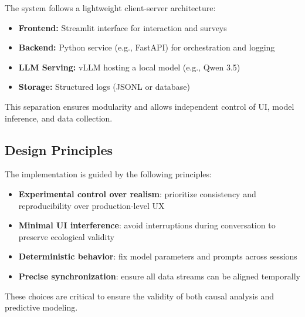 \documentclass{article}
\begin{document}
The system follows a lightweight client-server architecture:

\begin{itemize}
    \item \textbf{Frontend:} Streamlit interface for interaction and surveys
    \item \textbf{Backend:} Python service (e.g., FastAPI) for orchestration and logging
    \item \textbf{LLM Serving:} vLLM hosting a local model (e.g., Qwen 3.5)
    \item \textbf{Storage:} Structured logs (JSONL or database)
\end{itemize}

This separation ensures modularity and allows independent control of UI, model inference, and data collection.

\vspace{0.3cm}

\subsection{Design Principles}

The implementation is guided by the following principles:

\begin{itemize}
    \item \textbf{Experimental control over realism}: prioritize consistency and reproducibility over production-level UX
    \item \textbf{Minimal UI interference}: avoid interruptions during conversation to preserve ecological validity
    \item \textbf{Deterministic behavior}: fix model parameters and prompts across sessions
    \item \textbf{Precise synchronization}: ensure all data streams can be aligned temporally
\end{itemize}

These choices are critical to ensure the validity of both causal analysis and predictive modeling.
\end{document}
